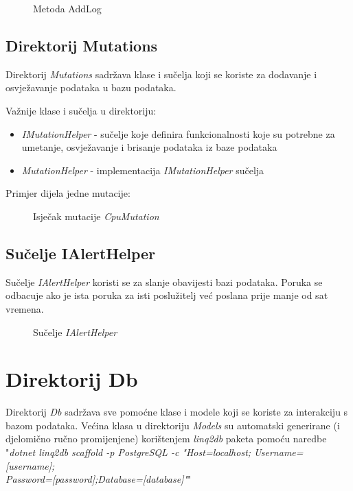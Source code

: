 \documentclass[zavrsnirad]{fer}
\begin{document}
\begin{figure}[htb]
	\centering
	
	\caption{Metoda AddLog}
\end{figure}
\FloatBarrier

\subsection{Direktorij Mutations}
Direktorij \textit{Mutations} sadržava klase i sučelja koji se koriste za dodavanje i osvježavanje podataka u bazu podataka.

Važnije klase i sučelja u direktoriju:
\begin{itemize}
	\item \textit{IMutationHelper} - sučelje koje definira funkcionalnosti koje su potrebne za umetanje, osvježavanje i brisanje podataka iz baze podataka
	\item \textit{MutationHelper} - implementacija \textit{IMutationHelper} sučelja
\end{itemize}

Primjer dijela jedne mutacije:
\begin{figure}[htb]
	\centering
	
	\caption{Isječak mutacije \textit{CpuMutation}}
\end{figure}
\FloatBarrier

\subsection{Sučelje IAlertHelper}
Sučelje \textit{IAlertHelper} koristi se za slanje obavijesti bazi podataka. Poruka se odbacuje ako je ista poruka za isti poslužitelj već poslana prije manje od sat vremena.
\begin{figure}[htb]
	\centering
	
	\caption{Sučelje \textit{IAlertHelper}}
\end{figure}
\FloatBarrier

\section{Direktorij Db}
\label{pog:db_dir}
Direktorij \textit{Db} sadržava sve pomoćne klase i modele koji se koriste za interakciju s bazom podataka. Većina klasa u direktoriju \textit{Models} su automatski generirane (i djelomično ručno promijenjene) korištenjem \textit{linq2db} paketa pomoću naredbe "\textit{dotnet linq2db scaffold -p PostgreSQL -c "Host=localhost; Username=[username];\\Password=[password];Database=[database]"}"
\end{document}
